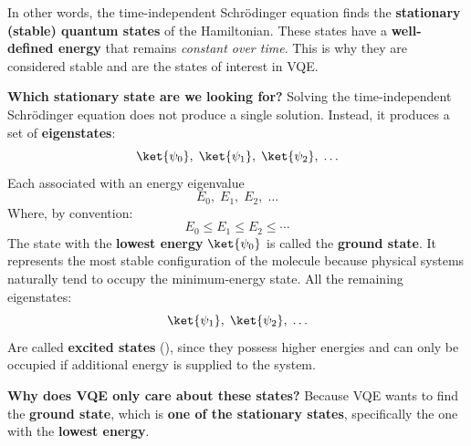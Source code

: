 \highspace
In other words, the time-independent Schrödinger equation finds the \textbf{stationary (stable) quantum states} of the Hamiltonian. These states have a \textbf{well-defined energy} that remains \emph{constant over time}. This is why they are considered stable and are the states of interest in VQE.

\highspace
\textcolor{Green3}{ \textbf{Which stationary state are we looking for?}}
Solving the time-independent Schrödinger equation does not produce a single solution. Instead, it produces a set of \textbf{eigenstates}:
\begin{equation*}
    \ket{\psi_0},\;
    \ket{\psi_1},\;
    \ket{\psi_2},\;\ldots
\end{equation*}
Each associated with an energy eigenvalue
\begin{equation*}
    E_0,\;
    E_1,\;
    E_2,\;\ldots
\end{equation*}
Where, by convention:
\begin{equation*}
    E_0 \le E_1 \le E_2 \le \cdots
\end{equation*}
The state with the \textbf{lowest energy} $\ket{\psi_0}$ is called the \textbf{ground state}. It represents the most stable configuration of the molecule because physical systems naturally tend to occupy the minimum-energy state. All the remaining eigenstates:
\begin{equation*}
    \ket{\psi_1},\;
    \ket{\psi_2},\;\ldots
\end{equation*}
Are called \textbf{excited states} (), since they possess higher energies and can only be occupied if additional energy is supplied to the system.

\highspace
\textcolor{Green3}{ \textbf{Why does VQE only care about these states?}} Because VQE wants to find the \textbf{ground state}, which is \textbf{one of the stationary states}, specifically the one with the \textbf{lowest energy}.

